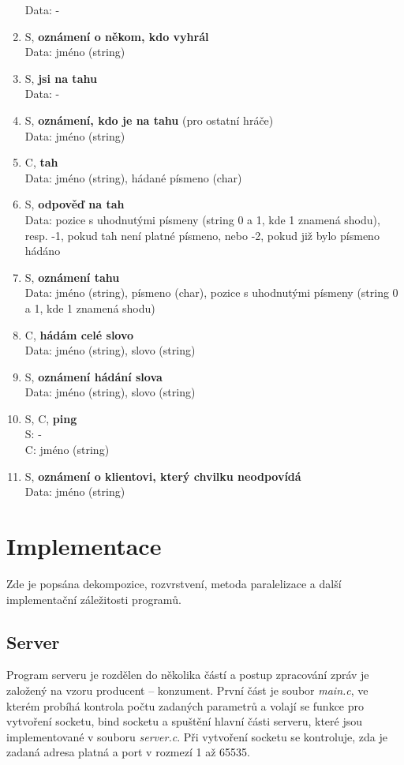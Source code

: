 \documentclass[12pt, a4paper]{article}
\begin{document}
\begin{enumerate}
		Data: -
		\item S, \textbf{oznámení o někom, kdo vyhrál}\\
		Data: jméno (string)
		\item S, \textbf{jsi na tahu}\\
		Data: -
		\item S, \textbf{oznámení, kdo je na tahu} (pro ostatní hráče)\\
		Data: jméno (string)
		\item C, \textbf{tah}\\
		Data: jméno (string), hádané písmeno (char)
		\item S, \textbf{odpověď na tah}\\
		Data: pozice s uhodnutými písmeny (string 0 a 1, kde 1 znamená shodu), resp. -1, pokud tah není platné písmeno, nebo -2, pokud již bylo písmeno hádáno
		\item S, \textbf{oznámení tahu}\\
		Data: jméno (string), písmeno (char), pozice s uhodnutými písmeny (string 0 a 1, kde 1 znamená shodu)
		\item C, \textbf{hádám celé slovo}\\
		Data: jméno (string), slovo (string)
		\item S, \textbf{oznámení hádání slova}\\
		Data: jméno (string), slovo (string)
		\item S, C, \textbf{ping}\\
		S: -\\
		C: jméno (string)
		\item S, \textbf{oznámení o klientovi, který chvilku neodpovídá}\\
		Data: jméno (string)
		\end{enumerate}
		
	\section{Implementace}
	Zde je popsána dekompozice, rozvrstvení, metoda paralelizace a další implementační záležitosti programů.
	
		\subsection{Server}
		Program serveru je rozdělen do několika částí a postup zpracování zpráv je založený na vzoru producent -- konzument. První část je soubor \emph{main.c}, ve kterém probíhá kontrola počtu zadaných parametrů a volají se funkce pro vytvoření socketu, bind socketu a spuštění hlavní části serveru, které jsou implementované v souboru \emph{server.c}. Při vytvoření socketu se kontroluje, zda je zadaná adresa platná a port v rozmezí 1 až 65535.
		
\end{document}
